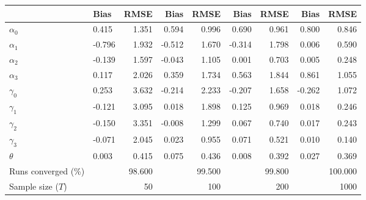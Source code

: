 
\begin{tabular}[t]{llrrrrrrr}
\toprule
  & Bias & RMSE & Bias & RMSE & Bias & RMSE & Bias & RMSE\\
\midrule
$\alpha_{0}$ & 0.415 & 1.351 & 0.594 & 0.996 & 0.690 & 0.961 & 0.800 & 0.846\\
$\alpha_{1}$ & -0.796 & 1.932 & -0.512 & 1.670 & -0.314 & 1.798 & 0.006 & 0.590\\
$\alpha_{2}$ & -0.139 & 1.597 & -0.043 & 1.105 & 0.001 & 0.703 & 0.005 & 0.248\\
$\alpha_{3}$ & 0.117 & 2.026 & 0.359 & 1.734 & 0.563 & 1.844 & 0.861 & 1.055\\
$\gamma_{0}$ & 0.253 & 3.632 & -0.214 & 2.233 & -0.207 & 1.658 & -0.262 & 1.072\\
$\gamma_{1}$ & -0.121 & 3.095 & 0.018 & 1.898 & 0.125 & 0.969 & 0.018 & 0.246\\
$\gamma_{2}$ & -0.150 & 3.351 & -0.008 & 1.299 & 0.067 & 0.740 & 0.017 & 0.243\\
$\gamma_{3}$ & -0.071 & 2.045 & 0.023 & 0.955 & 0.071 & 0.521 & 0.010 & 0.140\\
$\theta$ & 0.003 & 0.415 & 0.075 & 0.436 & 0.008 & 0.392 & 0.027 & 0.369\\
Runs converged (\%) &  & 98.600 &  & 99.500 &  & 99.800 &  & 100.000\\
Sample size ($T$) &  & 50 &  & 100 &  & 200 &  & 1000\\
\bottomrule
\end{tabular}
